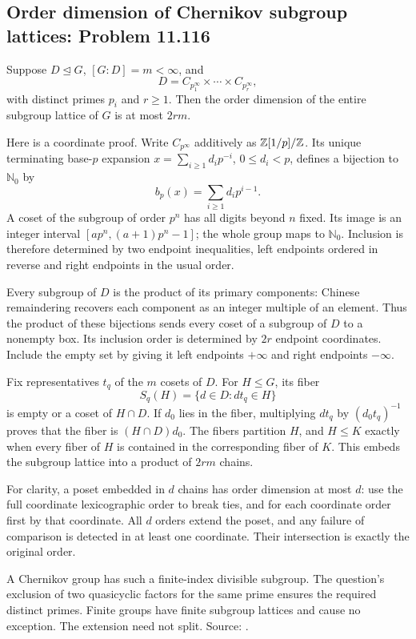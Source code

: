 \subsection{Order dimension of Chernikov subgroup lattices: Problem 11.116}
\label{cand:11.116}

Suppose \(D\trianglelefteq G\), \([G:D]=m<\infty\), and
\[
 D=C_{p_1^\infty}\times\cdots\times C_{p_r^\infty},
\]
with distinct primes \(p_i\) and \(r\geq1\).
Then the order dimension of the entire subgroup lattice of
\(G\) is at most \(2rm\).

Here is a coordinate proof. Write \(C_{p^\infty}\)
additively as \(\mathbb Z[1/p]/\mathbb Z\). Its unique terminating
base-\(p\) expansion
\(x=\sum_{i\geq1}d_i p^{-i}\), \(0\leq d_i<p\),
defines a bijection to \(\mathbb N_0\) by
\[
 b_p(x)=\sum_{i\geq1}d_i p^{i-1}.
\]
A coset of the subgroup of order \(p^n\) has all
digits beyond \(n\) fixed. Its image is an integer
interval \([ap^n,(a+1)p^n-1]\); the whole group maps
to \(\mathbb N_0\). Inclusion is therefore determined
by two endpoint inequalities, left endpoints ordered
in reverse and right endpoints in the usual order.

Every subgroup of \(D\) is the product of its primary
components: Chinese remaindering recovers each component
as an integer multiple of an element. Thus the product
of these bijections sends every coset of a subgroup of
\(D\) to a nonempty box. Its inclusion order is determined
by \(2r\) endpoint coordinates. Include the empty set
by giving it left endpoints \(+\infty\) and right
endpoints \(-\infty\).

Fix representatives \(t_q\) of the \(m\) cosets of \(D\).
For \(H\leq G\), its fiber
\[
 S_q(H)=\{d\in D:dt_q\in H\}
\]
is empty or a coset of \(H\cap D\). If \(d_0\) lies
in the fiber, multiplying \(dt_q\) by
\((d_0t_q)^{-1}\) proves that the fiber is
\((H\cap D)d_0\). The fibers partition \(H\), and
\(H\leq K\) exactly when every fiber of \(H\) is
contained in the corresponding fiber of \(K\).
This embeds the subgroup lattice into a product of
\(2rm\) chains.

For clarity, a poset embedded in \(d\) chains has order
dimension at most \(d\): use the full coordinate
lexicographic order to break ties, and for each
coordinate order first by that coordinate. All \(d\)
orders extend the poset, and any failure of comparison
is detected in at least one coordinate. Their
intersection is exactly the original order.

A Chernikov group has such a finite-index divisible
subgroup. The question's exclusion of two quasicyclic
factors for the same prime ensures the required distinct
primes. Finite groups have finite subgroup lattices
and cause no exception. The extension need not split.
Source: .

